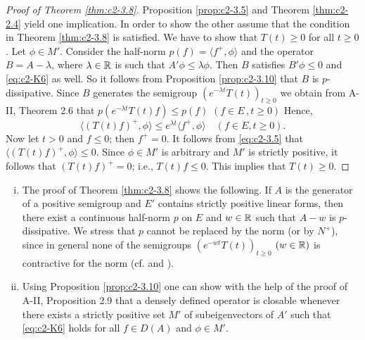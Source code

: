 \begin{proof}[Proof of Theorem \ref{thm:c2-3.8}]
Proposition \ref{prop:c2-3.5} and Theorem \ref{thm:c2-2.4}   yield one implication. 
In order to show the other assume that the condition in
Theorem \ref{thm:c2-3.8}   is satisfied. 
We have to show that $T(t) \geq 0$ for all $t \geq 0$.
Let $\phi \in M'$. 
Consider the half-norm $p(f) = \langle f^{+},\phi \rangle$ and the operator $B = A - \lambda$, where $\lambda \in \mathbb{R}$ is such that $A'\phi \leq \lambda\phi$. 
Then $B$ satisfies $B'\phi \leq 0$ and \ref{eq:c2-K6}   as well. 
So it follows from Proposition \ref{prop:c2-3.10}   that $B$ is $p$-dissipative.
Since $B$ generates the semigroup $(e^{-\lambda t}T(t))_{t \geq 0}$ we obtain from
A-II, Theorem 2.6 that $p(e^{-\lambda t}T(t)f) \leq p(f)$ $(f \in E\, , t\geq 0)$  
Hence,
\begin{equation} \label{eq:c2-3.5}
\langle (T(t)f)^{+}, \phi \rangle \leq e^{\lambda t} \langle f^{+}, \phi \rangle \quad (f \in E, t \geq 0).
\end{equation}
Now let $t > 0$ and $f \leq 0$; then $f^{+} = 0$. 
It follows from \eqref{eq:c2-3.5} that $\langle (T(t)f)^{+},\phi \rangle \leq 0$.
Since $\phi \in M'$ is arbitrary and $M'$ is strictly positive, it follows that $(T(t)f)^{+} = 0$; i.e., $T(t)f \leq 0$. 
This implies that $T(t) \geq 0$.
\end{proof}

\begin{remark}\label{rem:c2-3.11}
\begin{enumerate}[(i)]
\item \label{rem:c2-3.11-1}
The proof of Theorem \ref{thm:c2-3.8}   shows the following. 
If $A$ is the generator of a positive semigroup and $E'$ contains strictly
positive linear forms, then there exist a continuous half-norm $p$ on
$E$ and $w \in \mathbb{R}$ such that $A - w$ is $p$-dissipative. 
We stress that $p$ cannot be replaced by the norm (or by $N^{+}$), since in general none of the semigroups $(e^{-wt}T(t))_{t \geq 0}$ $(w \in \mathbb{R})$ is contractive for the norm (cf. \citet{derndinger:1984} and \citet{battydavies:1982}).
\item  \label{rem:c2-3.11-2}
Using Proposition \ref{prop:c2-3.10}   one can show with the help of the proof of 
A-II,  Proposition 2.9 that a densely defined operator is closable whenever
there exists a strictly positive set $M'$ of subeigenvectors of $A'$
such that \eqref{eq:c2-K6}   holds for all $f \in D(A)$ and $\phi \in M'$.
\end{enumerate}
\end{remark}

